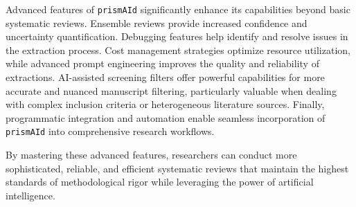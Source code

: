 Advanced features of \texttt{prismAId} significantly enhance its capabilities beyond basic systematic reviews. Ensemble reviews provide increased confidence and uncertainty quantification. Debugging features help identify and resolve issues in the extraction process. Cost management strategies optimize resource utilization, while advanced prompt engineering improves the quality and reliability of extractions. AI-assisted screening filters offer powerful capabilities for more accurate and nuanced manuscript filtering, particularly valuable when dealing with complex inclusion criteria or heterogeneous literature sources. Finally, programmatic integration and automation enable seamless incorporation of \texttt{prismAId} into comprehensive research workflows.

By mastering these advanced features, researchers can conduct more sophisticated, reliable, and efficient systematic reviews that maintain the highest standards of methodological rigor while leveraging the power of artificial intelligence.
